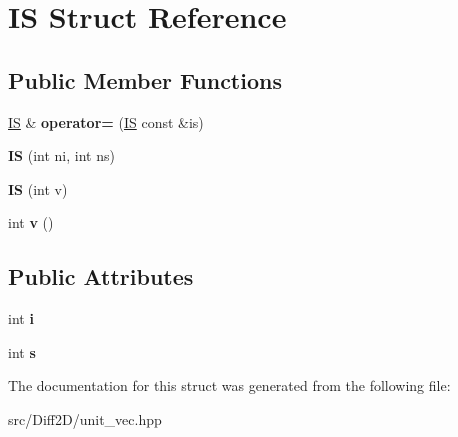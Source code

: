 \hypertarget{structIS}{
\section{IS Struct Reference}
\label{structIS}
}
\subsection*{Public Member Functions}
\begin{DoxyCompactItemize}
\item 
\hypertarget{structIS_aec66c50fd699031a1f617117c67eda11}{
\hyperlink{structIS}{IS} \& {\bfseries operator=} (\hyperlink{structIS}{IS} const \&is)}
\label{structIS_aec66c50fd699031a1f617117c67eda11}

\item 
\hypertarget{structIS_a2cb6d148c70406c11b9508be2cfddd7e}{
{\bfseries IS} (int ni, int ns)}
\label{structIS_a2cb6d148c70406c11b9508be2cfddd7e}

\item 
\hypertarget{structIS_a53883df04399eab305d240898e889271}{
{\bfseries IS} (int v)}
\label{structIS_a53883df04399eab305d240898e889271}

\item 
\hypertarget{structIS_ad474289c5f0f5f5b231cd2067547cc0f}{
int {\bfseries v} ()}
\label{structIS_ad474289c5f0f5f5b231cd2067547cc0f}

\end{DoxyCompactItemize}
\subsection*{Public Attributes}
\begin{DoxyCompactItemize}
\item 
\hypertarget{structIS_ac0a890989ec0d04b8db157583b154c17}{
int {\bfseries i}}
\label{structIS_ac0a890989ec0d04b8db157583b154c17}

\item 
\hypertarget{structIS_a3a4dc37a5dc69fa81e33c5e7115dca71}{
int {\bfseries s}}
\label{structIS_a3a4dc37a5dc69fa81e33c5e7115dca71}

\end{DoxyCompactItemize}


The documentation for this struct was generated from the following file:\begin{DoxyCompactItemize}
\item 
src/Diff2D/unit\_\-vec.hpp\end{DoxyCompactItemize}

